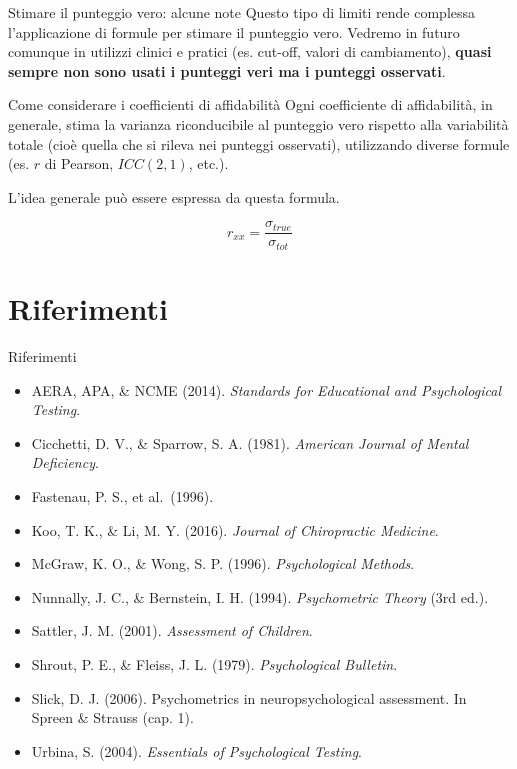 \documentclass[
  ignorenonframetext,
  aspectratio=169,
]{beamer}
\providecommand{\tightlist}{%
  \setlength{\itemsep}{0pt}\setlength{\parskip}{0pt}}
\begin{document}
\begin{frame}{Stimare il punteggio vero: alcune note}
\label{stimare-il-punteggio-vero-alcune-note-1}
Questo tipo di limiti rende complessa l'applicazione di formule per
stimare il punteggio vero. Vedremo in futuro comunque in utilizzi
clinici e pratici (es. cut-off, valori di cambiamento), \textbf{quasi
sempre non sono usati i punteggi veri ma i punteggi osservati}.
\end{frame}

\begin{frame}{Come considerare i coefficienti di affidabilità}
\label{come-considerare-i-coefficienti-di-affidabilituxe0}
Ogni coefficiente di affidabilità, in generale, stima la varianza
riconducibile al punteggio vero rispetto alla variabilità totale (cioè
quella che si rileva nei punteggi osservati), utilizzando diverse
formule (es. \(r\) di Pearson, \(ICC(2,1)\), etc.).

L'idea generale può essere espressa da questa formula.

\[
r_{xx} = \frac{\sigma_{true}}{\sigma_{tot}}
\]
\end{frame}

\section{Riferimenti}\label{riferimenti}

\begin{frame}{Riferimenti}
\label{riferimenti-1}
\footnotesize

\begin{itemize}
\tightlist
\item
  AERA, APA, \& NCME (2014). \emph{Standards for Educational and
  Psychological Testing}.
\item
  Cicchetti, D. V., \& Sparrow, S. A. (1981). \emph{American Journal of
  Mental Deficiency}.
\item
  Fastenau, P. S., et al.~(1996).
\item
  Koo, T. K., \& Li, M. Y. (2016). \emph{Journal of Chiropractic
  Medicine}.
\item
  McGraw, K. O., \& Wong, S. P. (1996). \emph{Psychological Methods}.
\item
  Nunnally, J. C., \& Bernstein, I. H. (1994). \emph{Psychometric
  Theory} (3rd ed.).
\item
  Sattler, J. M. (2001). \emph{Assessment of Children}.
\item
  Shrout, P. E., \& Fleiss, J. L. (1979). \emph{Psychological Bulletin}.
\item
  Slick, D. J. (2006). Psychometrics in neuropsychological assessment.
  In Spreen \& Strauss (cap. 1).
\item
  Urbina, S. (2004). \emph{Essentials of Psychological Testing}.
\end{itemize}
\end{frame}
\end{document}
